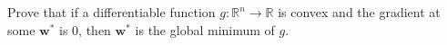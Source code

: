 
Prove that if a differentiable function $g : \mathbb{R}^{n} \rightarrow \mathbb{R}$ is convex and the gradient
at some $\mathbf{w}^*$ is 0, then $\mathbf{w}^*$ is the global minimum of $g$.